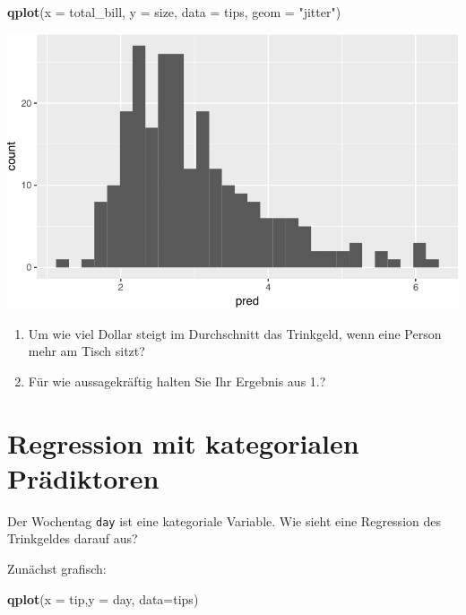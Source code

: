\documentclass[12pt,]{book}
\newenvironment{Shaded}{\begin{snugshade}}{\end{snugshade}}
\newcommand{\KeywordTok}[1]{\textcolor[rgb]{0.13,0.29,0.53}{\textbf{{#1}}}}
\newcommand{\DataTypeTok}[1]{\textcolor[rgb]{0.13,0.29,0.53}{{#1}}}
\newcommand{\StringTok}[1]{\textcolor[rgb]{0.31,0.60,0.02}{{#1}}}
\newcommand{\NormalTok}[1]{{#1}}
\let\BeginKnitrBlock\begin \let\EndKnitrBlock\end
\begin{document}
\begin{Shaded}
\begin{Highlighting}[]
\KeywordTok{qplot}\NormalTok{(}\DataTypeTok{x =} \NormalTok{total_bill, }\DataTypeTok{y =} \NormalTok{size, }\DataTypeTok{data =} \NormalTok{tips, }\DataTypeTok{geom =} \StringTok{"jitter"}\NormalTok{)}
\end{Highlighting}
\end{Shaded}

\begin{center}\includegraphics[width=0.7\linewidth]{071_Regression_files/figure-latex/unnamed-chunk-10-1} \end{center}

\BeginKnitrBlock{rmdexercises}
\begin{enumerate}
\def\labelenumi{\arabic{enumi}.}
\item
  Um wie viel Dollar steigt im Durchschnitt das Trinkgeld, wenn eine
  Person mehr am Tisch sitzt?
\item
  Für wie aussagekräftig halten Sie Ihr Ergebnis aus 1.?
\end{enumerate}
\EndKnitrBlock{rmdexercises}

\section{Regression mit kategorialen
Prädiktoren}\label{regression-mit-kategorialen-pradiktoren}

Der Wochentag \texttt{day} ist eine kategoriale Variable. Wie sieht eine
Regression des Trinkgeldes darauf aus?

Zunächst grafisch:

\begin{Shaded}
\begin{Highlighting}[]
\KeywordTok{qplot}\NormalTok{(}\DataTypeTok{x =} \NormalTok{tip,}\DataTypeTok{y =} \NormalTok{day, }\DataTypeTok{data=}\NormalTok{tips)}
\end{Highlighting}
\end{Shaded}
\end{document}
